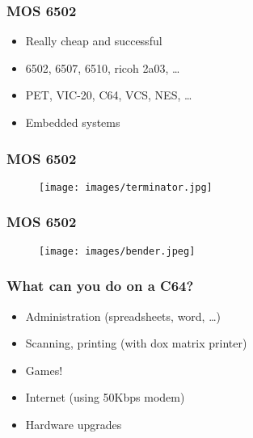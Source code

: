 \documentclass[aspectratio=43]{uva-inf-presentation}
\begin{document}
\begin{frame}
\frametitle{MOS 6502}

\begin{itemize}
\item Really cheap and successful
\item 6502, 6507, 6510, ricoh 2a03, \dots
\item PET, VIC-20, C64, VCS, NES, \dots
\item Embedded systems
\end{itemize}

\end{frame}


\begin{frame}
\frametitle{MOS 6502}

\begin{figure}
\texttt{[image: images/terminator.jpg]}
\end{figure}

\end{frame}


\begin{frame}
\frametitle{MOS 6502}

\begin{figure}
\texttt{[image: images/bender.jpeg]}
\end{figure}

\end{frame}


\begin{frame}
\frametitle{What can you do on a C64?}

\begin{itemize}
\item Administration (spreadsheets, word, \dots)
\item Scanning, printing (with dox matrix printer)
\item Games!
\item Internet (using 50Kbps modem)
\item Hardware upgrades
\end{itemize}

\end{frame}

\end{document}
